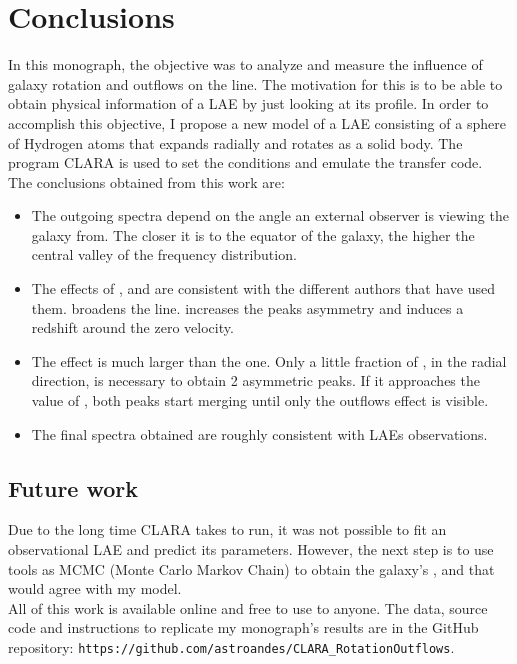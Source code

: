 \setcounter{equation}{0}
\chapter{Conclusions}
In this monograph, the objective was to analyze and measure the influence of galaxy rotation and outflows on the \lya line. The motivation for this is to be able to obtain physical information of a LAE by just looking at its \lya profile. In order to accomplish this objective, I propose a new model of a LAE consisting of a sphere of Hydrogen atoms that expands radially and rotates as a solid body. The program CLARA \cite{CLARA} is used to set the conditions and emulate the transfer code. \\

The conclusions obtained from this work are: \\

\begin{itemize}
\item The outgoing spectra depend on the angle an external observer is viewing the galaxy from. The closer it is to the equator of the galaxy, the higher the central valley of the frequency distribution. \\

\item The effects of \vrot, \vout and \tauh are consistent with the different authors that have used them. \vrot broadens the \lya line. \vout increases the peaks asymmetry and \tauh induces a redshift around the zero velocity.\\

\vfill

\item The \vrot effect is much larger than the \vout one. Only a little fraction of \vrot, in the radial direction, is necessary to obtain 2 asymmetric peaks. If it \vout approaches the value of \vrot, both peaks start merging until only the outflows effect is visible. \\

\item The final spectra obtained are roughly consistent with LAEs observations.  \\

\end{itemize}

\section{Future work}

Due to the long time CLARA takes to run, it was not possible to fit an observational LAE and predict its parameters. However, the next step is to use tools as MCMC (Monte Carlo Markov Chain) to obtain the galaxy's \tauh, \vrot and \vout that would agree with my model. \\

All of this work is available online and free to use to anyone. The data, source code and instructions to replicate my monograph's results are in the GitHub repository:  \texttt{https://github.com/astroandes/CLARA\_RotationOutflows}. \\

